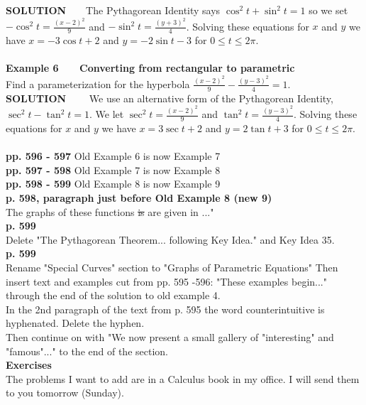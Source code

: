 \documentclass[11pt]{report}
\newcommand{\ds}{\displaystyle}
\begin{document}
\textbf{SOLUTION}~~~~The Pythagorean Identity says $\cos^2t+\sin^2t=1$ so we set $\ds -\cos^2 t =\frac{(x-2)^2}{9}$ and $\ds -\sin^2 t=\frac{(y+3)^2}{4}$. Solving these equations for $x$ and $y$ we have $x=-3\cos t+2$ and $y=-2\sin t-3$  for $0\leq t\leq 2\pi$.\\ \\

\textbf{Example 6~~~ Converting from rectangular to parametric}\\

Find a parameterization for the hyperbola $\ds \frac{(x-2)^2}{9}-\frac{(y-3)^2}{4}=1$.\\

\textbf{SOLUTION}~~~~ We use an alternative form of the Pythagorean Identity, $\sec^2t-\tan^2t=1$. We let  $\ds \sec^2 t=\frac{(x-2)^2}{9}$ and 
$\tan^2 t=\frac{(y-3)^2}{4}$. Solving these equations for $x$ and $y$ we have $x=3\sec t +2$ and $y=2\tan t +3$ for $0\leq t\leq 2\pi$.\\ \\

\textbf{pp. 596 - 597} Old Example 6 is now Example 7\\
\textbf{pp. 597 - 598} Old Example 7 is now Example 8\\
\textbf{pp. 598 - 599} Old Example 8 is now Example 9\\

\textbf{p. 598, paragraph just before Old Example 8 (new 9)}\\
The graphs of these functions \sout{is} are given in ..."\\

\textbf{p. 599}\\
Delete "The Pythagorean Theorem... following Key Idea." and Key Idea 35.\\

\textbf{p. 599}\\
Rename "Special Curves" section to "Graphs of Parametric Equations" Then insert text and examples cut from pp. 595 -596: "These examples begin..." through the end of the solution to old example 4.\\
In the 2nd paragraph of the text from p. 595 the word counterintuitive is hyphenated. Delete the hyphen.\\

Then continue on with "We now present a small gallery of "interesting" and "famous"..." to the end of the section.\\

\textbf{Exercises}\\
The problems I want to add are in a Calculus book in my office. I will send them to you tomorrow (Sunday).
\end{document}
